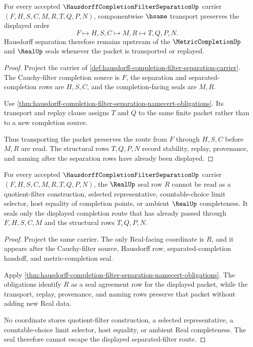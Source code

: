 \begin{theorem}
\label{thm:hausdorff-completion-filter-separation-obligation-separation-stability}
For every accepted $\HausdorffCompletionFilterSeparationUp$ carrier $(F,H,S,C,M,R,T,Q,P,N)$, componentwise $\hsame$ transport preserves the displayed order
$$
F \longmapsto H,S,C \longmapsto M,R \longmapsto T,Q,P,N .
$$
Hausdorff separation therefore remains upstream of the $\MetricCompletionUp$ and $\RealUp$ seals whenever the packet is transported or replayed.
\end{theorem}
\begin{proof}
Project the carrier of \autoref{def:hausdorff-completion-filter-separation-carrier}. The Cauchy-filter completion source is $F$, the separation and separated-completion rows are $H,S,C$, and the completion-facing seals are $M,R$.

Use \autoref{thm:hausdorff-completion-filter-separation-namecert-obligations}. Its transport and replay clause assigns $T$ and $Q$ to the same finite packet rather than to a new completion source.

Thus transporting the packet preserves the route from $F$ through $H,S,C$ before $M,R$ are read. The structural rows $T,Q,P,N$ record stability, replay, provenance, and naming after the separation rows have already been displayed.
\end{proof}

\begin{theorem}
\label{thm:hausdorff-completion-filter-separation-seal-nonescape}
For every accepted $\HausdorffCompletionFilterSeparationUp$ carrier $(F,H,S,C,M,R,T,Q,P,N)$, the $\RealUp$ seal row $R$ cannot be read as a quotient-filter construction, selected representative, countable-choice limit selector, host equality of completion points, or ambient $\RealUp$ completeness. It seals only the displayed completion route that has already passed through $F,H,S,C,M$ and the structural rows $T,Q,P,N$.
\end{theorem}
\begin{proof}
Project the same carrier. The only Real-facing coordinate is $R$, and it appears after the Cauchy-filter source, Hausdorff row, separated-completion handoff, and metric-completion seal.

Apply \autoref{thm:hausdorff-completion-filter-separation-namecert-obligations}. The obligations identify $R$ as a seal agreement row for the displayed packet, while the transport, replay, provenance, and naming rows preserve that packet without adding new Real data.

No coordinate stores quotient-filter construction, a selected representative, a countable-choice limit selector, host equality, or ambient Real completeness. The seal therefore cannot escape the displayed separated-filter route.
\end{proof}

